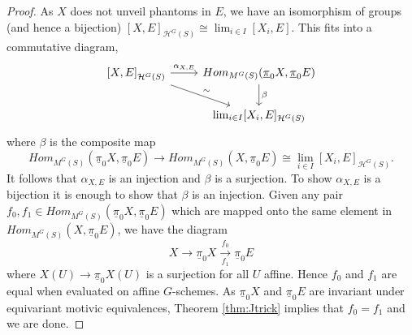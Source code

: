 \documentclass[11pt,twoside]{amsart}
\theoremstyle{definition}
\theoremstyle{remark}
\numberwithin{equation}{section}
\newcommand{\mc}{\mathcal}
\begin{document}
 		\begin{proof}
 			As $X$ does not unveil phantoms in $E$, we have an isomorphism of groups (and hence a bijection) $[X,E]_{\mc{H}^G(S)} \cong \lim_{i\in I} [X_i,E]$. This fits into a commutative diagram,
 			\[
 				\begin{tikzcd}
 				{[X,E]}_{\mc{H}^G(S)}\arrow[r,"\alpha_{X,E}"]\arrow[rd,"\sim"] &Hom_{M^G(S)}(\underline{\pi}_0 X, \underline{\pi}_0E)\arrow[d,"\beta"] \\
 				&\lim_{i\in I} [X_i,E]_{\mc{H}^G(S)}
 				\end{tikzcd}
 				\]
 				where $\beta$ is the composite map 
 				\[Hom_{M^G(S)}(\underline{\pi}_0 X, \underline{\pi}_0E)\to Hom_{M^G(S)}(X, \underline{\pi}_0E)\cong \lim_{i\in I} [X_i,E]_{\mc{H}^G(S)}.\]
 				It follows that $\alpha_{X,E}$ is an injection and $\beta$ is a surjection. To show $\alpha_{X,E}$ is a bijection it is enough to show that $\beta$ is an injection. Given any pair $f_0,f_1\in Hom_{M^G(S)}(\underline{\pi}_0 X, \underline{\pi}_0E)$ which are mapped onto the same element in $Hom_{M^G(S)}(X, \underline{\pi}_0E)$, we have the diagram
 				\[ X\to\underline{\pi}_0 X\xrightarrow[f_1]{f_0} \underline{\pi}_0E \]
 				where $X(U)\to \underline{\pi}_0 X(U)$ is a surjection for all $U$ affine.  Hence $f_0$ and $f_1$ are equal when evaluated on affine $G$-schemes. As $\underline{\pi}_0 X$ and $\underline{\pi}_0E$ are invariant under equivariant motivic equivalences, Theorem \ref{thm:Jtrick} implies that $f_0=f_1$ and we are done.   
 		\end{proof}
 	
\end{document}
